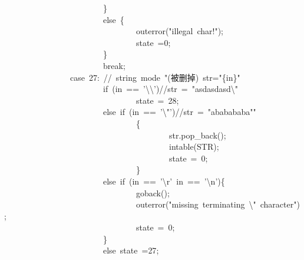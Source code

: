 \documentclass{article}
\begin{document}
\begin{mdpre}
~~~~~~~~~~~~~~~~~~~~~~~~\}\\
~~~~~~~~~~~~~~~~~~~~~~~~{else}~\{\\
~~~~~~~~~~~~~~~~~~~~~~~~~~~~~~~~outerror({"}{illegal~char!}{"});\\
~~~~~~~~~~~~~~~~~~~~~~~~~~~~~~~~state~={0};\\
~~~~~~~~~~~~~~~~~~~~~~~~\}\\
~~~~~~~~~~~~~~~~~~~~~~~~{break};\\
~~~~~~~~~~~~~~~~{case}~{27}:~{//~string~mode~"(被删掉)~str="\{in\}"}\\
~~~~~~~~~~~~~~~~~~~~~~~~{if}~(in~==~{'}{\textbackslash{}\textbackslash{}}{'}){//str~=~"asdasdasd\textbackslash{}"}\\
~~~~~~~~~~~~~~~~~~~~~~~~~~~~~~~~state~=~{28};\\
~~~~~~~~~~~~~~~~~~~~~~~~{else}~{if}~(in~==~{'}{\textbackslash{}"}{'}){//str~=~"ababababa""}\\
~~~~~~~~~~~~~~~~~~~~~~~~~~~~~~~~\{\\
~~~~~~~~~~~~~~~~~~~~~~~~~~~~~~~~~~~~~~~~str.pop\_back();\\
~~~~~~~~~~~~~~~~~~~~~~~~~~~~~~~~~~~~~~~~intable({STR});\\
~~~~~~~~~~~~~~~~~~~~~~~~~~~~~~~~~~~~~~~~state~=~{0};\\
~~~~~~~~~~~~~~~~~~~~~~~~~~~~~~~~\}\\
~~~~~~~~~~~~~~~~~~~~~~~~{else}~{if}~(in~==~{'}{\textbackslash{}r}{'}\textbar{}\textbar{}~in~==~{'}{\textbackslash{}n}{'})\{\\
~~~~~~~~~~~~~~~~~~~~~~~~~~~~~~~~goback();\\
~~~~~~~~~~~~~~~~~~~~~~~~~~~~~~~~outerror({"}{missing~terminating~}{\textbackslash{}"}{~character}{"});\\
~~~~~~~~~~~~~~~~~~~~~~~~~~~~~~~~state~=~{0};\\
~~~~~~~~~~~~~~~~~~~~~~~~\}\\
~~~~~~~~~~~~~~~~~~~~~~~~{else}~state~={27};\\

\end{mdpre}
\end{document}
